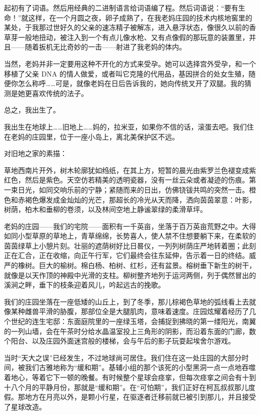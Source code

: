\documentclass[AutoFakeBold=true]{book}
\begin{document}
起初有了词语。然后用经典的二进制语言给词语编了程。然后词语说：``要有生命！''就这样，在一个月圆之夜，卵子成熟了，在我老妈庄园的技术内核地窖里的某处，于我那过世好久的父亲的速冻精子被解冻，进入悬浮状态，像很久以前的香草芽一般地扭动，被注入到一个有点儿像水枪、又有点像假的那玩意的装置里，并且——随着扳机无比奇妙的一击——射进了我老妈的体内。

当然，老妈并非一定要用这种不开化的方式来受孕。她可以选择宫外受孕，和一个移植了父亲 DNA 的情人做爱，或者叫它克隆的代用品，基因拼合的处女生殖，随便你怎么称呼……可是，就像老妈在日后告诉我的，她向传统叉开了双腿。我的猜测是她更喜欢传统的法子。

总之，我出生了。

我出生在地球上……旧地上……妈的，拉米亚，如果你不信的话，滚蛋去吧。我们住在老妈的庄园里，位于一座小岛上，离北美保护区不远。

对旧地之家的素描：

草地西南片开外，树木轮廓犹如绉纸，在其上方，短暂的晨光由紫罗兰色褪变成紫红色，然后是紫色。天空仿若精美的透明瓷器，没有一丝云朵或者凝迹的伤痕。第一束日光，如同交响乐前的宁静；紧随而来的日出，仿佛铙钹共鸣的突然一击。橙色和赤褐色爆发成金灿灿的光芒，那超长的冷光从天而降，洒向茵茵翠意：叶影，树荫，柏木和垂柳的卷须，以及林间空地上静谧翠绿的柔滑草坪。

老妈的庄园——我们的宅院——面积有一千英亩，坐落于百万英亩荒野之中。大得如同小型草原的草地上，青草绵绵，长势喜人，使人禁不住想要躺下来，在柔软的茵茵绿草上小憩片刻。壮丽的遮荫树好比日晷仪，一列列树荫庄严地转着圈；此刻正在汇合，正在收缩，向正午行军，它们最终会往东延伸，告示着一日的终结。威严的橡树。巨大的榆树。棉白杨、柏树、红杉，还有盆景。榕树垂下新生的树干，就像是以天作顶的神殿中光滑的支柱。柳树整齐地列于运河两侧，列于偶然冒出的溪涧之畔，垂下的枝条迎着风儿，吟起远古的挽歌。

我们的庄园坐落在一座低矮的山丘上，到了冬季，那儿棕褐色草地的弧线看上去就像某种雌兽平滑的胁腹，那部位全是大腿肌肉，意味着速度。庄园炫耀着经历了几个世纪的连生宅邸：东面庭院里的一座绿玉塔，会捕捉到拂晓的第一缕阳光，南翼的一列山墙，会在午茶时分给水晶温室投上三角形的阴影，而沿着东面的门廊，数个阳台、以及庄园外面迷宫般的楼梯，会与午后的影子玩耍起埃舍尔游戏。

当时``天大之误''已经发生，不过地球尚可居住。我们住在这一处庄园的大部分时间，被我们古雅地称为``缓和期''。基辅小组的那个该死的小型黑洞一点一点地吞噬着地心，等着它下一顿的晚餐。有时候整个星球会痉挛，但每次痉挛之间会有十到十八个月的平静月份，那就是``缓和期''。在``可怕期''，我们正好在柯瓦叔叔那儿度假。那地方在月亮以外，是颗小行星，在驱逐者迁移前就已被引到那儿，并且接受了星球改造。
\end{document}
